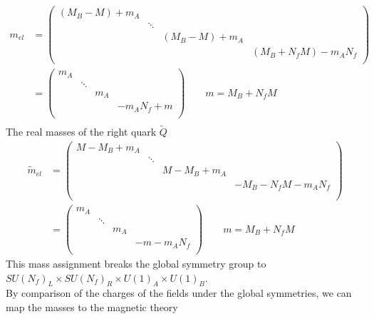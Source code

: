 \begin{align}
m_{el} &= 
\begin{pmatrix}
   (M_B - M)  + m_A \\ &  \ddots 
   \\ 
   &  & (M_B - M)  + m_A \\
   &  &  & (M_B + N_f M) - m_A N_f  \\
  \end{pmatrix} \\
& = 
\begin{pmatrix}
   m_A \\ &  \ddots 
   \\ 
    & & m_A \\
    & &  & - m_A N_f + m  \\
  \end{pmatrix} \qquad m = M_B + N_f M\\
  \end{align}
The real masses of the right quark $\tilde{Q}$
  \begin{align}
\tilde{m}_{el} &= 
\begin{pmatrix}
%
M -M_B   + m_A \\ & \ddots \\ & &  M -M_B   + m_A \\
& & &  - M_B -  N_f M - m_A N_f \\
\\
\end{pmatrix}
\\
&= 
 \begin{pmatrix}
  m_A \\ & \ddots \\ & &  m_A \\ & &  &  - m - m_A N_f \\     
 \end{pmatrix}
  \qquad m = M_B + N_f M
 \label{eqn:real_mass_reduction_el}
\end{align}
This mass assignment breaks the global symmetry group to $SU(N_f)_L \times SU(N_f)_R \times U(1)_A \times U(1)_B$.\\
By comparison of the charges of the fields under the global symmetries, we can map the masses to the magnetic theory
